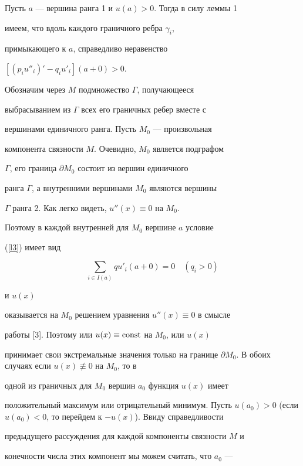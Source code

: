 {{{{{{{Пусть $a$ --- вершина ранга 1 и $u(a) > 0$. Тогда в силу леммы 1


имеем, что вдоль каждого граничного ребра $\gamma_i$,


примыкающего к $a$, справедливо неравенство


$[(p_iu''_{i})'-q_iu'_{i}](a+0)>0$.





Обозначим через $M$ подмножество $\Gamma$, получающееся


выбрасыванием из $\Gamma$ всех его граничных ребер вместе с


вершинами единичного ранга. Пусть $M_0$ --- произвольная


компонента связности $M$. Очевидно, $M_0$ является подграфом


$\Gamma$, его граница $\partial M_0$ состоит из вершин единичного


ранга $\Gamma$, а внутренними вершинами $M_0$ являются вершины


$\Gamma$ ранга 2. Как легко видеть, $u''(x)\equiv 0$ на $M_0$.


Поэтому в каждой внутренней для $M_0$ вершине $a$ условие


(\ref{l3}) имеет вид


\begin{equation}


\label{l8}


\sum_{i \in I(a)}q u'_{i}(a+0)=0 \quad (q_i>0)


\end{equation}


и $u(x)$


оказывается на $M_0$ решением уравнения $u''(x)\equiv 0$ в смысле


работы [3]. Поэтому или $u(x)\equiv \operatorname{const}$ на $M_0$, или $u(x)$


принимает свои экстремальные значения только на границе $\partial


M_0$. В обоих случаях если $u(x)\not\equiv 0$ на $M_0$, то в


одной из граничных для $M_0$ вершин $a_0$ функция $u(x)$ имеет


положительный максимум или отрицательный минимум. Пусть $u(a_{0}) >


0$ (если $u(a_{0}) < 0$, то перейдем к $-u(x)$). Ввиду справедливости


предыдущего рассуждения для каждой компоненты связности $M$ и


конечности числа этих компонент мы можем считать, что $a_0$ ---


}}}}}}}
